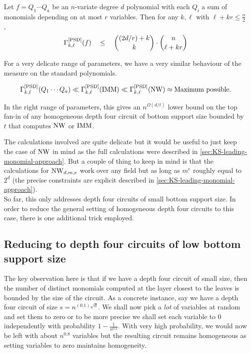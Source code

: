 \begin{lemma*}
Let $f = Q_1\cdots Q_a$ be an $n$-variate degree $d$ polynomial with each $Q_i$ a sum of monomials depending on at most $r$ variables. Then for any $k,\ell$ with $\ell + kr\leq \frac{n}{2}$, 
\[
\Gamma^{\mathrm{[PSD]}}_{k,\ell}(f) \quad \leq \quad \binom{(2d/r) + k}{k} \cdot \binom{n}{\ell + kr}
\]
\end{lemma*}

For a very delicate range of parameters, we have a very similar behaviour of the measure on the standard polynomials. 

\[
\Gamma^{\mathrm{[PSD]}}_{k,\ell}(Q_1\cdots Q_a) \ll \Gamma^{\mathrm{[PSD]}}_{k,\ell}(\operatorname{\mathrm{IMM}}) \ll \Gamma^{\mathrm{[PSD]}}_{k,\ell}(\operatorname{\mathrm{NW}}) \approx \text{Maximum possible}.
\]

In the right range of parameters, this gives an $n^{\Omega(d/t)}$ lower bound on the top fan-in of any homogeneous depth four circuit of bottom support size bounded by $t$ that computes $\operatorname{\mathrm{NW}}$ or $\operatorname{\mathrm{IMM}}$. 

The calculations involved are quite delicate but it would be useful to just keep the case of $\operatorname{\mathrm{NW}}$ in mind as the full calculations were described in \autoref{sec:KS-leading-monomial-approach}. But a couple of thing to keep in mind is that the calculations for $\operatorname{\mathrm{NW}}_{d,m,e}$ work over any field but as long as $m^e$ roughly equal to $2^d$ (the precise constraints are explicit described in \autoref{sec:KS-leading-monomial-approach}). \\

So far, this only addresses depth four circuits of small bottom support size. In order to reduce the general setting of homogeneous depth four circuits to this case, there is one additional trick employed. 

\subsection{Reducing  to depth four circuits of low bottom support size}

The key observation here is that if we have a depth four circuit of small size, then the number of distinct monomials computed at the layer closest to the leaves is bounded by the size of the circuit.
As a concrete instance, say we have a depth four circuit of size $s = n^{(0.1) \sqrt{d}}$.
We shall now pick a \emph{lot} of variables at random and set them to zero or to be more precise we shall set each variable to $0$ independently with probability $1 - \frac{1}{n^{0.2}}$. With very high probability, we would now be left with about $n^{0.8}$ variables but the resulting circuit remains homogeneous as setting variables to zero maintains homogeneity. 

